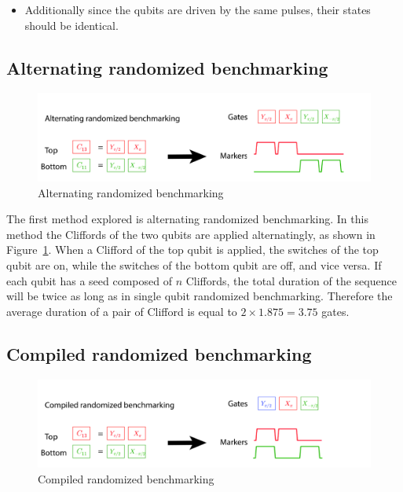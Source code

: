       \begin{itemize}
        \item Additionally since the qubits are driven by the same pulses, their states should be identical.
      \end{itemize}

      \subsection{Alternating randomized benchmarking}
        \label{ssec:alternating randomized benchmarking}

        \begin{figure}[tb]
          \centering
          \includegraphics[width=\textwidth]{../Figures/Randomized benchmarking/alternating RB.jpg}
          \caption{Alternating randomized benchmarking}
          \label{fig:alternating RB schematic}
        \end{figure}

        The first method explored is alternating randomized benchmarking. In this method the Cliffords of the two qubits are applied alternatingly, as shown in Figure~\ref{fig:alternating RB schematic}. When a Clifford of the top qubit is applied, the switches of the top qubit are on, while the switches of the bottom qubit are off, and vice versa. If each qubit has a seed composed of $n$ Cliffords, the total duration of the sequence will be twice as long as in single qubit randomized benchmarking. Therefore the average duration of a pair of Clifford is equal to $2 \times 1.875 = 3.75$ gates.


      \subsection{Compiled randomized benchmarking}
        \label{ssec:compiled randomized benchmarking}

        \begin{figure}[tb]
          \centering
          \includegraphics[width=\textwidth]{../Figures/Randomized benchmarking/compiled RB.jpg}
          \caption{Compiled randomized benchmarking}
          \label{fig:compiled RB schematic}
        \end{figure}

